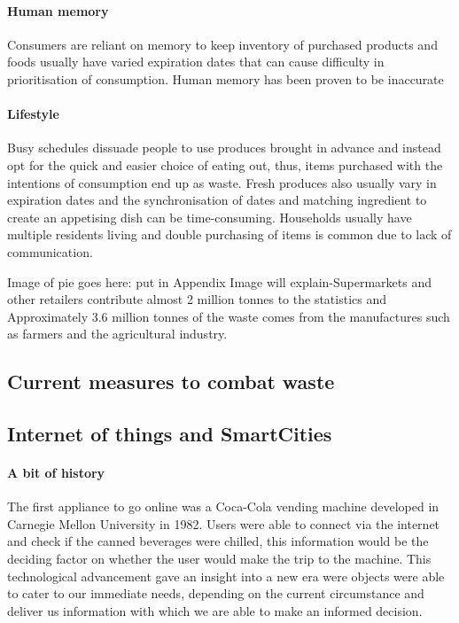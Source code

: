 \documentclass[a4paper, 11pt]{article}
\begin{document}
\paragraph{Human memory}
Consumers are reliant on memory to keep inventory of purchased products and foods usually have varied expiration dates that can cause difficulty in prioritisation of consumption. Human memory has been proven to be inaccurate

\paragraph{Lifestyle}Busy schedules dissuade people to use produces brought in advance and instead opt for the quick and easier choice of eating out, thus, items purchased with the intentions of consumption end up as waste. Fresh produces also usually vary in expiration dates and the synchronisation of dates and matching ingredient to create an appetising dish can be time-consuming. Households usually have multiple residents living and double purchasing of items is common due to lack of communication. 

\vspace{\baselineskip}
Image of pie goes here: put in Appendix Image will explain-Supermarkets and other retailers contribute almost 2 million tonnes to the statistics and Approximately 3.6 million tonnes of the waste comes from the manufactures such as farmers and the agricultural industry.


\subsection{Current measures to combat waste}

\subsection{Internet of things and SmartCities}
\paragraph{A bit of history} The first appliance to go online was a Coca-Cola vending machine developed in Carnegie Mellon University in 1982. Users were able to connect via the internet and check if the canned beverages were chilled, this information would be the deciding factor on whether the user would make the trip to the machine. This technological advancement gave an insight into a new era were objects were able to cater to our immediate needs, depending on the current circumstance and deliver us information with which we are able to make an informed decision.
\end{document}
